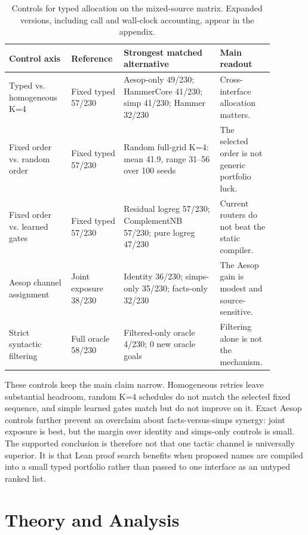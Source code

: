 \documentclass{article}
\begin{document}
\begin{table}[H]
\caption{Controls for typed allocation on the mixed-source matrix. Expanded versions, including call and wall-clock accounting, appear in the appendix.}
\label{tab:control-ablations}
\centering
\small
\begin{tabular}{@{}L{0.22\linewidth}L{0.16\linewidth}L{0.34\linewidth}L{0.16\linewidth}@{}}
\toprule
Control axis & Reference & Strongest matched alternative & Main readout \\
\midrule
Typed vs. homogeneous K=4 & Fixed typed 57/230 & Aesop-only 49/230; HammerCore 41/230; simp 41/230; Hammer 32/230 & Cross-interface allocation matters. \\
\addlinespace[2pt]
Fixed order vs. random order & Fixed typed 57/230 & Random full-grid K=4: mean 41.9, range 31--56 over 100 seeds & The selected order is not generic portfolio luck. \\
\addlinespace[2pt]
Fixed order vs. learned gates & Fixed typed 57/230 & Residual logreg 57/230; ComplementNB 57/230; pure logreg 47/230 & Current routers do not beat the static compiler. \\
\addlinespace[2pt]
Aesop channel assignment & Joint exposure 38/230 & Identity 36/230; simps-only 35/230; facts-only 32/230 & The Aesop gain is modest and source-sensitive. \\
\addlinespace[2pt]
Strict syntactic filtering & Full oracle 58/230 & Filtered-only oracle 4/230; 0 new oracle goals & Filtering alone is not the mechanism. \\
\bottomrule
\end{tabular}
\end{table}

These controls keep the main claim narrow. Homogeneous retries leave substantial headroom, random K=4 schedules do not match the selected fixed sequence, and simple learned gates match but do not improve on it. Exact Aesop controls further prevent an overclaim about facts-versus-simps synergy: joint exposure is best, but the margin over identity and simps-only controls is small. The supported conclusion is therefore not that one tactic channel is universally superior. It is that Lean proof search benefits when proposed names are compiled into a small typed portfolio rather than passed to one interface as an untyped ranked list.

\section{Theory and Analysis}
\end{document}
